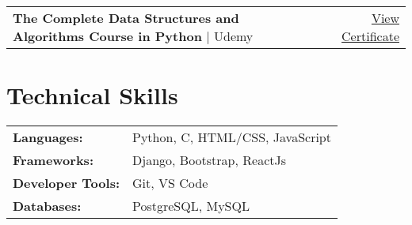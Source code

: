 \documentclass[a4paper,12pt]{article}
\begin{document}
\begin{tabularx}{\linewidth}{ @{}l r@{} }
\textbf{The Complete Data Structures and Algorithms Course in Python} $|$ Udemy & \hfill \href{https://www.udemy.com/certificate/UC-ab804445-d20b-4dd7-950b-41b0fa715490/}{View Certificate} \\
\end{tabularx}


\section{Technical Skills}
\begin{tabularx}{\linewidth}{@{}l X@{}}
\textbf{Languages:} &  \normalsize{Python, C, HTML/CSS, JavaScript}\\
\textbf{Frameworks:}  &  \normalsize{Django, Bootstrap, ReactJs}\\  
\textbf{Developer Tools:} &  \normalsize{Git, VS Code}\\
\textbf{Databases:}  &  \normalsize{ PostgreSQL, MySQL}\\  
\end{tabularx}

\vfill
{}
\end{document}
